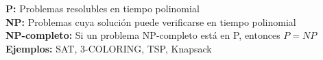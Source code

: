\textbf{P:} Problemas resolubles en tiempo polinomial \\
\textbf{NP:} Problemas cuya solución puede verificarse en tiempo polinomial \\
\textbf{NP-completo:} Si un problema NP-completo está en P, entonces \( P = NP \) \\
\textbf{Ejemplos:} SAT, 3-COLORING, TSP, Knapsack
